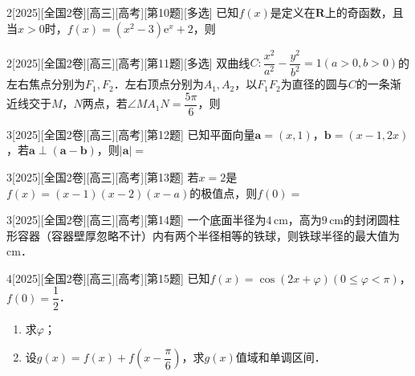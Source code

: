 \begin{example}{2}[2025][全国2卷][高三][高考][第10题][多选]
已知$f(x)$是定义在$\mathbf{R}$上的奇函数，且当$x>0$时，$f(x)=(x^2-3)\text{e}^x+2$，则\blankbox
\begin{choices}
\end{choices}
\end{example}

\begin{example}{2}[2025][全国2卷][高三][高考][第11题][多选]
双曲线$C:\dfrac{x^2}{a^2}-\dfrac{y^2}{b^2}=1(a>0,b>0)$的左右焦点分别为$F_1,F_2$．左右顶点分别为$A_1,A_2$，以$F_1F_2$为直径的圆与$C$的一条渐近线交于$M$，$N$两点，若$\angle MA_1N=\dfrac{5\pi}{6}$，则\blankbox
\begin{choices}
\end{choices}
\end{example}
\begin{example}{3}[2025][全国2卷][高三][高考][第12题]
已知平面向量$\boldsymbol{a}=(x,1)$，$\boldsymbol{b}=(x-1,2x)$，若$\boldsymbol{a}\perp(\boldsymbol{a}-\boldsymbol{b})$，则$|\boldsymbol{a}|=$\blankline
\end{example}

\begin{example}{3}[2025][全国2卷][高三][高考][第13题]
若$x=2$是$f(x)=(x-1)(x-2)(x-a)$的极值点，则$f(0)=$\blankline
\end{example}

\begin{example}{3}[2025][全国2卷][高三][高考][第14题]
一个底面半径为$4\,\text{cm}$，高为$9\,\text{cm}$的封闭圆柱形容器（容器壁厚忽略不计）内有两个半径相等的铁球，则铁球半径的最大值为\blankline$\text{cm}$．
\end{example}
\begin{example}{4}[2025][全国2卷][高三][高考][第15题]
已知$f(x)=\cos(2x+\varphi)(0\le \varphi<\pi)$，$f(0)=\dfrac{1}{2}$．
\begin{enumerate}
    \item 求$\varphi$；
    \item 设$g(x)=f(x)+f\left(x-\dfrac{\pi}{6}\right)$，求$g(x)$值域和单调区间．
\end{enumerate}
\end{example}

